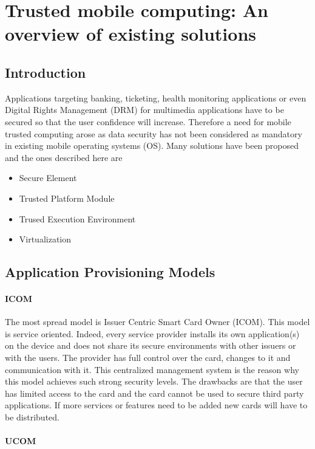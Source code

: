 \documentclass{article}
\begin{document}
\section{Trusted mobile computing: An overview of existing solutions}

\subsection{Introduction}

Applications targeting banking, ticketing, health monitoring applications or even Digital Rights Management (DRM) for multimedia applications have to be secured so that the user confidence will increase. Therefore a need for mobile trusted computing arose as data security has not been considered as mandatory in existing mobile operating systems (OS). Many solutions have been proposed and the ones described here are \begin{itemize}
\item Secure Element
\item Trusted Platform Module
\item Trused Execution Environment
\item Virtualization
\end{itemize}

\subsection{Application Provisioning Models}

\paragraph{ICOM}

The most spread model is Issuer Centric Smart Card Owner (ICOM). This model is service oriented. Indeed, every service provider installs its own application(s) on the device and does not share its secure environments with other issuers or with the users. The provider has full control over the card, changes to it and communication with it. This centralized management system is the reason why this model achieves such strong security levels. The drawbacks are that the user has limited access to the card and the card cannot be used to secure third party applications. If more services or features need to be added new cards will have to be distributed.

\paragraph{UCOM}
\end{document}
